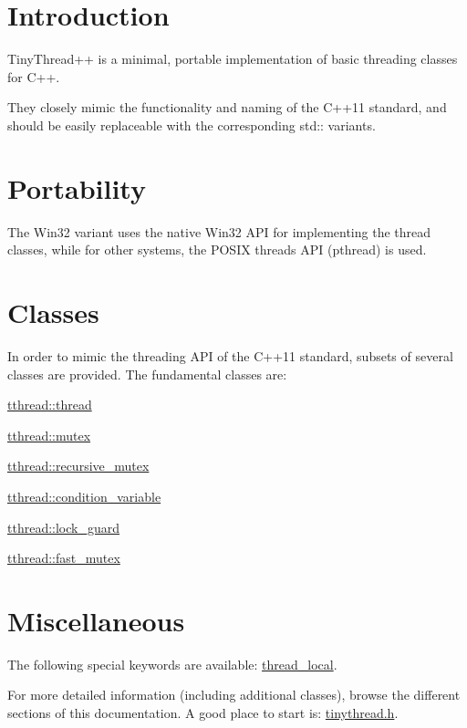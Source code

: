 \hypertarget{tinythread_intro_sec}{}\section{Introduction}\label{tinythread_intro_sec}
Tiny\+Thread++ is a minimal, portable implementation of basic threading classes for C++.

They closely mimic the functionality and naming of the C++11 standard, and should be easily replaceable with the corresponding std\+:\+: variants.\hypertarget{tinythread_port_sec}{}\section{Portability}\label{tinythread_port_sec}
The Win32 variant uses the native Win32 A\+PI for implementing the thread classes, while for other systems, the P\+O\+S\+IX threads A\+PI (pthread) is used.\hypertarget{tinythread_class_sec}{}\section{Classes}\label{tinythread_class_sec}
In order to mimic the threading A\+PI of the C++11 standard, subsets of several classes are provided. The fundamental classes are\+: \begin{DoxyItemize}
\item \hyperlink{classtthread_1_1thread}{tthread\+::thread} \item \hyperlink{classtthread_1_1mutex}{tthread\+::mutex} \item \hyperlink{classtthread_1_1recursive__mutex}{tthread\+::recursive\+\_\+mutex} \item \hyperlink{classtthread_1_1condition__variable}{tthread\+::condition\+\_\+variable} \item \hyperlink{classtthread_1_1lock__guard}{tthread\+::lock\+\_\+guard} \item \hyperlink{classtthread_1_1fast__mutex}{tthread\+::fast\+\_\+mutex}\end{DoxyItemize}
\hypertarget{tinythread_misc_sec}{}\section{Miscellaneous}\label{tinythread_misc_sec}
The following special keywords are available\+: \hyperlink{tinythread_8h_ad4d9b405bcbffaf0d4dae6166c18aa1e}{thread\+\_\+local}.

For more detailed information (including additional classes), browse the different sections of this documentation. A good place to start is\+: \hyperlink{tinythread_8h}{tinythread.\+h}. 